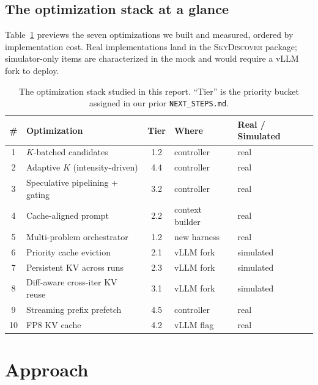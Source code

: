 \documentclass[11pt]{article}
\newcommand{\skyd}{\textsc{SkyDiscover}}
\begin{document}
\subsection{The optimization stack at a glance}

Table~\ref{tab:stack} previews the seven optimizations we built and
measured, ordered by implementation cost. Real implementations land
in the \skyd{} package; simulator-only items are characterized in the
mock and would require a vLLM fork to deploy.

\begin{table}[ht]
\centering
\small
\caption{The optimization stack studied in this report. ``Tier'' is
the priority bucket assigned in our prior \texttt{NEXT\_STEPS.md}.}
\label{tab:stack}
\begin{tabular}{c l c l l}
\toprule
\# & Optimization & Tier & Where & Real / Simulated \\
\midrule
1  & $K$-batched candidates                  & 1.2 & controller       & real \\
2  & Adaptive $K$ (intensity-driven)         & 4.4 & controller       & real \\
3  & Speculative pipelining + gating         & 3.2 & controller       & real \\
4  & Cache-aligned prompt                    & 2.2 & context builder  & real \\
5  & Multi-problem orchestrator              & 1.2 & new harness      & real \\
6  & Priority cache eviction                 & 2.1 & vLLM fork        & simulated \\
7  & Persistent KV across runs               & 2.3 & vLLM fork        & simulated \\
8  & Diff-aware cross-iter KV reuse          & 3.1 & vLLM fork        & simulated \\
9  & Streaming prefix prefetch               & 4.5 & controller       & real \\
10 & FP8 KV cache                            & 4.2 & vLLM flag        & real \\
\bottomrule
\end{tabular}
\end{table}

\section{Approach}
\label{sec:approach}
\end{document}
